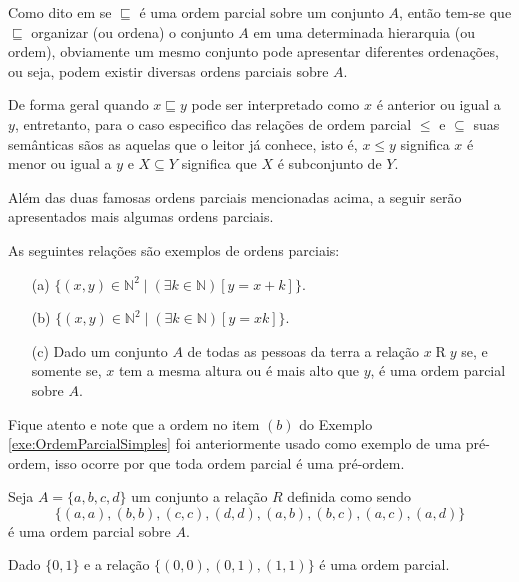 Como dito em \cite{abe1991-TC} se $\sqsubseteq$ é uma ordem parcial sobre um conjunto $A$, então tem-se que $\sqsubseteq$ organizar (ou ordena) o conjunto $A$ em uma determinada hierarquia (ou ordem), obviamente um mesmo conjunto pode apresentar diferentes ordenações, ou seja, podem existir diversas ordens parciais sobre $A$.

\begin{atencao}
  De forma geral quando $x \sqsubseteq y$ pode ser interpretado como $x$ é anterior ou igual a $y$, entretanto, para o caso especifico das relações de ordem parcial $\leq$ e $\subseteq$ suas semânticas sãos as aquelas que o leitor já conhece, isto é, $x \leq y$ significa $x$ é menor ou igual a $y$ e $X \subseteq Y$ significa que $X$ é subconjunto de $Y$.
\end{atencao}

Além das duas famosas ordens parciais mencionadas acima, a seguir serão apresentados mais algumas ordens parciais.

\begin{exemplo}\label{exe:OrdemParcialSimples}
	As seguintes relações são exemplos de ordens parciais:
	\begin{itemize}
		\item[(a)] $\{(x, y) \in \mathbb{N}^2 \mid (\exists k \in \mathbb{N})[y = x + k]\}$.
		\item[(b)] $\{(x, y) \in \mathbb{N}^2 \mid (\exists k \in \mathbb{N})[y = xk]\}$.
		\item[(c)] Dado um conjunto $A$ de todas as pessoas da terra a relação $x \mathrel{R} y$ se, e somente se, $x$ tem a mesma altura ou é mais alto que $y$, é uma ordem parcial sobre $A$.
	\end{itemize}
\end{exemplo}

Fique atento e note que a ordem no item $(b)$ do Exemplo \ref{exe:OrdemParcialSimples} foi anteriormente usado como exemplo de uma pré-ordem, isso ocorre por que toda ordem parcial é uma pré-ordem.

\begin{exemplo}
	Seja $A = \{a, b, c, d\}$ um conjunto a relação $R$ definida como sendo 
  $$\{(a, a), (b, b), (c, c), (d, d), (a, b), (b, c), (a, c), (a, d)\}$$ 
  é uma ordem parcial sobre $A$.
\end{exemplo}

\begin{exemplo}
	Dado $\{0,1\}$ e a relação $\{(0,0), (0, 1), (1, 1)\}$ é uma ordem parcial.
\end{exemplo}

